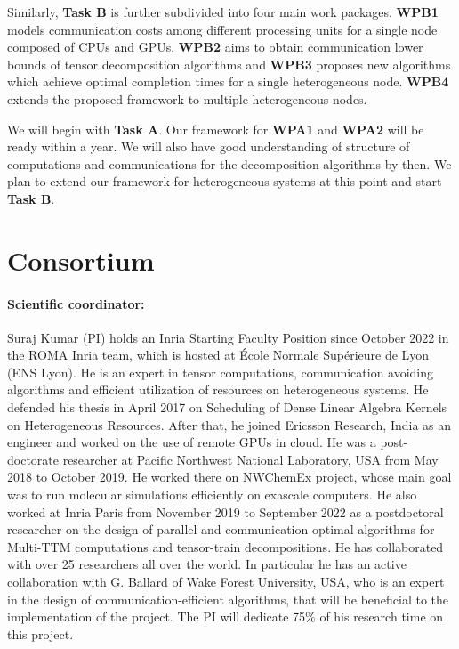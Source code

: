 \documentclass[a4paper,11pt]{article}
\begin{document}
	
	Similarly, \textbf{Task B} is further subdivided into four main work packages. \textbf{WPB1} models
	communication costs among different processing units for a single node composed of CPUs and GPUs. \textbf{WPB2} aims to obtain communication lower bounds of tensor decomposition algorithms and \textbf{WPB3} proposes new algorithms which achieve optimal completion times for a single heterogeneous node. \textbf{WPB4} extends the proposed framework to multiple heterogeneous nodes.
	
	
	
	We will begin with \textbf{Task A}. Our framework for \textbf{WPA1} and \textbf{WPA2} will be ready within a year. We will also have good understanding of structure of computations and communications for the decomposition algorithms by then. We plan to extend our framework for heterogeneous systems at this point and start \textbf{Task B}.
	
	

	\section{Consortium}


	\paragraph{Scientific coordinator:}Suraj Kumar (PI) holds an Inria Starting Faculty Position since October 2022 in the ROMA Inria team, which is hosted at École Normale Supérieure de Lyon (ENS Lyon). He is an expert in tensor computations, communication avoiding algorithms and efficient utilization of resources on heterogeneous systems. He defended his thesis in April 2017 on Scheduling of Dense Linear Algebra Kernels on Heterogeneous Resources. After that, he joined Ericsson Research, India as an engineer and worked on the use of remote GPUs in cloud. He was a post-doctorate researcher at Pacific Northwest National Laboratory, USA from May 2018 to October 2019. He worked there on \href{https://www.exascaleproject.org/research-project/nwchemex}{NWChemEx} project, whose main goal was to run molecular simulations efficiently on exascale computers. He also worked at Inria Paris from November 2019 to September 2022 as a postdoctoral researcher on the design of parallel and communication optimal algorithms for Multi-TTM computations and tensor-train decompositions. He has collaborated with over 25 researchers all over the world. In particular he has an active collaboration with G. Ballard of Wake Forest University, USA, who is an expert in the design of communication-efficient algorithms, that will be beneficial to the implementation of the project. The PI will dedicate 75\% of his research time on this project.
\end{document}
